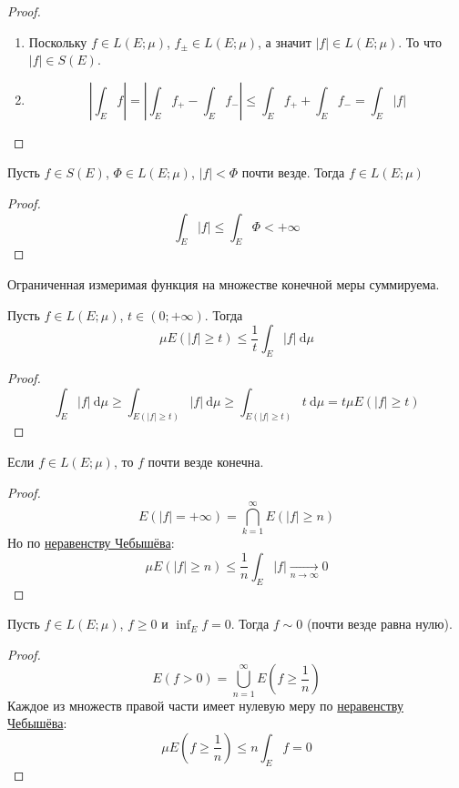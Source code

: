 \documentclass{article}
\begin{document}
    \begin{proof}
        \begin{enumerate}
            \item Поскольку $f\in L(E;\mu)$, $f_\pm\in L(E;\mu)$, а значит $|f|\in L(E;\mu)$. То что $|f|\in S(E)$.
            \item
            $$
            \left|\int_E f\right|=\left|\int_E f_+-\int_Ef_-\right|\leqslant\int_E f_++\int_Ef_-=\int_E|f|
            $$
        \end{enumerate}
    \end{proof}
    \begin{corollary}
        Пусть $f\in S(E)$, $\Phi\in L(E;\mu)$, $|f|<\Phi$ почти везде. Тогда $f\in L(E;\mu)$
    \end{corollary}
    \begin{proof}
        $$
        \int_E|f|\leqslant\int_E\Phi<+\infty
        $$
    \end{proof}
    \begin{corollary}
        Ограниченная измеримая функция на множестве конечной меры суммируема.
    \end{corollary}
    \begin{lemma}
        \label{Неравенство Чебышёва}
        Пусть $f\in L(E;\mu)$, $t\in(0;+\infty)$. Тогда
        $$
        \mu E(|f|\geqslant t)\leqslant\frac1t\int_E|f|~\mathrm d\mu
        $$
    \end{lemma}
    \begin{proof}
        $$
        \int_E|f|~\mathrm d\mu\geqslant\int_{E(|f|\geqslant t)}|f|~\mathrm d\mu\geqslant\int_{E(|f|\geqslant t)}t~\mathrm d\mu=t\mu E(|f|\geqslant t)
        $$
    \end{proof}
    \begin{corollary}
        Если $f\in L(E;\mu)$, то $f$ почти везде конечна.
    \end{corollary}
    \begin{proof}
        $$
        E(|f|=+\infty)=\bigcap\limits_{k=1}^\infty E(|f|\geqslant n)
        $$
        Но по \hyperref[Неравенство Чебышёва]{неравенству Чебышёва}:
        $$
        \mu E(|f|\geqslant n)\leqslant\frac1n\int_E|f|\underset{n\to\infty}\longrightarrow0
        $$
    \end{proof}
    \begin{corollary}
        Пусть $f\in L(E;\mu)$, $f\geqslant0$ и $\inf_Ef=0$. Тогда $f\sim0$ (почти везде равна нулю).
    \end{corollary}
    \begin{proof}
        $$
        E(f>0)=\bigcup\limits_{n=1}^\infty E\left(f\geqslant\frac1n\right)
        $$
        Каждое из множеств правой части имеет нулевую меру по \hyperref[Неравенство Чебышёва]{неравенству Чебышёва}:
        $$
        \mu E(f\geqslant\frac1n)\leqslant n\int_Ef=0
        $$
    \end{proof}
\end{document}
